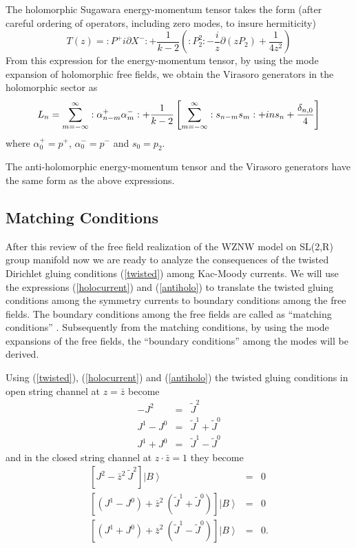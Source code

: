 \documentclass[a4paper,12pt]{article}
\begin{document}
The holomorphic Sugawara energy-momentum tensor takes the form (after
careful ordering of operators, including zero modes, to insure hermiticity)
\begin{equation}
T\left( z\right) =:P^{+}i\partial X^{-}:+\frac{1}{k-2}\left( :P_{2}^{2}:-%
\frac{i}{z}\partial \left( zP_{2}\right) +\frac{1}{4z^{2}}\right)
\label{T++}
\end{equation}
From this expression for the energy-momentum tensor, by using the mode
expansion of holomorphic free fields, we obtain the Virasoro generators in
the holomorphic sector as
\begin{equation}
L_{n}=\sum_{m=-\infty }^{\infty }:\alpha _{n-m}^{+}\alpha _{m}^{-}:+\frac{1}{%
k-2}\left[ \sum_{m=-\infty }^{\infty }:s_{n-m}s_{m}:+ins_{n}+\frac{\delta
_{n,0}}{4}\right]  \label{L_n}
\end{equation}
where $\alpha _{0}^{+}=p^{+}$, $\alpha _{0}^{-}=p^{-}$ and $s_{0}=p_{2}$.

The anti-holomorphic energy-momentum tensor and the Virasoro generators have
the same form as the above expressions.

\subsection{Matching Conditions}

After this review of the free field realization of the WZNW model on SL(2,R)
group manifold now we are ready to analyze the consequences of the twisted
Dirichlet gluing conditions (\ref{twisted}) among Kac-Moody currents. We
will use the expressions (\ref{holocurrent}) and (\ref{antiholo}) to
translate the twisted gluing conditions among the symmetry currents to
boundary conditions among the free fields. The boundary conditions among the
free fields are called as ``matching conditions'' \cite{ishikawa}.
Subsequently from the matching conditions, by using the mode expansions of
the free fields, the ``boundary conditions'' among the modes will be derived.

Using (\ref{twisted}), (\ref{holocurrent}) and (\ref{antiholo}) the twisted
gluing conditions in open string channel at $z=\bar{z}$ become
\begin{eqnarray}
-J^{2} &=&\tilde{J}^{2} \\
J^{1}-J^{0} &=&\tilde{J}^{1}+\tilde{J}^{0} \\
J^{1}+J^{0} &=&\tilde{J}^{1}-\tilde{J}^{0}
\end{eqnarray}
and in the closed string channel at $z\cdot \bar{z}=1$ they become
\begin{eqnarray}
\left[ J^{2}-\bar{z}^{2}\ \tilde{J}^{2}\right] \left| B\right\rangle &=&0 \\
\left[ \left( J^{1}-J^{0}\right) +\bar{z}^{2}\ \left( \tilde{J}^{1}+\tilde{J}%
^{0}\right) \right] \left| B\right\rangle &=&0 \\
\left[ \left( J^{1}+J^{0}\right) +\bar{z}^{2}\ \left( \tilde{J}^{1}-\tilde{J}%
^{0}\right) \right] \left| B\right\rangle &=&0.
\end{eqnarray}
\end{document}
